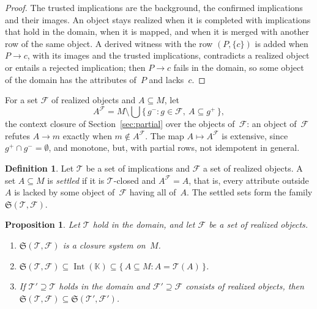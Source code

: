 \documentclass[11pt,a4paper]{article}
\newtheorem{proposition}{Proposition}
\theoremstyle{definition}
\newtheorem{definition}{Definition}
\theoremstyle{remark}
\newcommand{\pos}{^{+}}
\newcommand{\nega}{^{-}}
\newcommand{\Int}{\operatorname{Int}}
\begin{document}
\begin{proof}
The trusted implications are the background, the confirmed implications and their images. An object stays realized when it is completed with implications that hold in the domain, when it is mapped, and when it is merged with another row of the same object. A derived witness with the row $(P, \{c\})$ is added when $P \to c$, with its images and the trusted implications, contradicts a realized object or entails a rejected implication; then $P \to c$ fails in the domain, so some object of the domain has the attributes of~$P$ and lacks~$c$.
\end{proof}

For a set $\mathcal{F}$ of realized objects and $A \subseteq M$, let
\[
  A^{\mathcal{F}} = M \setminus \bigcup \{\, g\nega : g \in \mathcal{F},\ A \subseteq g\pos \,\},
\]
the context closure of Section~\ref{sec:partial} over the objects of~$\mathcal{F}$: an object of~$\mathcal{F}$ refutes $A \to m$ exactly when $m \notin A^{\mathcal{F}}$. The map $A \mapsto A^{\mathcal{F}}$ is extensive, since $g\pos \cap g\nega = \emptyset$, and monotone, but, with partial rows, not idempotent in general.

\begin{definition}\label{def:settled}
Let $\mathcal{T}$ be a set of implications and $\mathcal{F}$ a set of realized objects. A set $A \subseteq M$ is \emph{settled} if it is $\mathcal{T}$-closed and $A^{\mathcal{F}} = A$, that is, every attribute outside~$A$ is lacked by some object of~$\mathcal{F}$ having all of~$A$. The settled sets form the family $\mathfrak{S}(\mathcal{T}, \mathcal{F})$.
\end{definition}

\begin{proposition}\label{prop:settled}
Let $\mathcal{T}$ hold in the domain, and let $\mathcal{F}$ be a set of realized objects.
\begin{enumerate}
  \item $\mathfrak{S}(\mathcal{T}, \mathcal{F})$ is a closure system on~$M$.
  \item $\mathfrak{S}(\mathcal{T}, \mathcal{F}) \subseteq \Int(\mathbb{K}) \subseteq \{\, A \subseteq M : A = \mathcal{T}(A) \,\}$.
  \item If $\mathcal{T}' \supseteq \mathcal{T}$ holds in the domain and $\mathcal{F}' \supseteq \mathcal{F}$ consists of realized objects, then $\mathfrak{S}(\mathcal{T}, \mathcal{F}) \subseteq \mathfrak{S}(\mathcal{T}', \mathcal{F}')$.
\end{enumerate}
\end{proposition}
\end{document}
